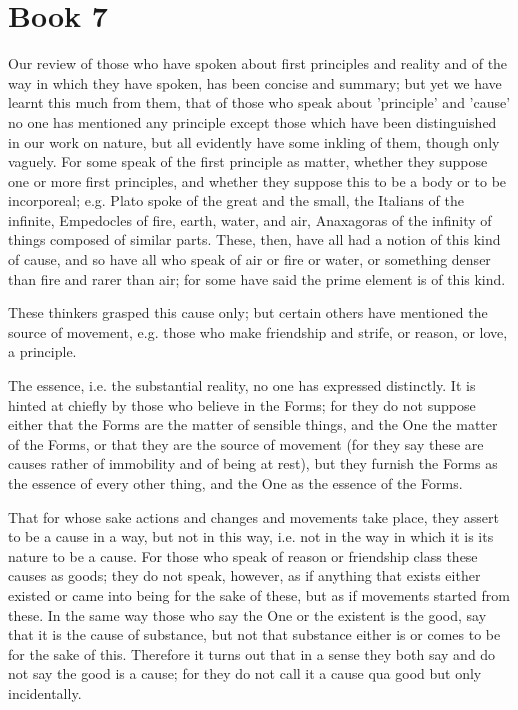 \documentclass[oneside, 17pt, dvipsnames]{extbook}
\begin{document}
\newpage
\section{Book 7}

Our review of those who have spoken about first principles and reality and of the way in which they have spoken, has been concise and summary; but yet we have learnt this much from them, that of those who speak about 'principle' and 'cause' no one has mentioned any principle except those which have been distinguished in our work on nature, but all evidently have some inkling of them, though only vaguely. For some speak of the first principle as matter, whether they suppose one or more first principles, and whether they suppose this to be a body or to be incorporeal; e.g. Plato spoke of the great and the small, the Italians of the infinite, Empedocles of fire, earth, water, and air, Anaxagoras of the infinity of things composed of similar parts. These, then, have all had a notion of this kind of cause, and so have all who speak of air or fire or water, or something denser than fire and rarer than air; for some have said the prime element is of this kind.

These thinkers grasped this cause only; but certain others have mentioned the source of movement, e.g. those who make friendship and strife, or reason, or love, a principle.

The essence, i.e. the substantial reality, no one has expressed distinctly. It is hinted at chiefly by those who believe in the Forms; for they do not suppose either that the Forms are the matter of sensible things, and the One the matter of the Forms, or that they are the source of movement (for they say these are causes rather of immobility and of being at rest), but they furnish the Forms as the essence of every other thing, and the One as the essence of the Forms.

That for whose sake actions and changes and movements take place, they assert to be a cause in a way, but not in this way, i.e. not in the way in which it is its nature to be a cause. For those who speak of reason or friendship class these causes as goods; they do not speak, however, as if anything that exists either existed or came into being for the sake of these, but as if movements started from these. In the same way those who say the One or the existent is the good, say that it is the cause of substance, but not that substance either is or comes to be for the sake of this. Therefore it turns out that in a sense they both say and do not say the good is a cause; for they do not call it a cause qua good but only incidentally.
\end{document}
